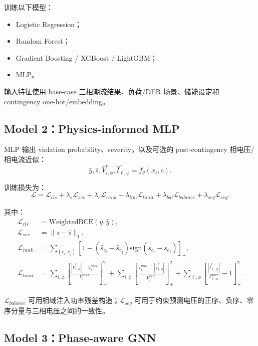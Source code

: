 \documentclass[UTF8,11pt]{ctexart}
\begin{document}
训练以下模型：

\begin{itemize}
    \item Logistic Regression；
    \item Random Forest；
    \item Gradient Boosting / XGBoost / LightGBM；
    \item MLP。
\end{itemize}

输入特征使用 base-case 三相潮流结果、负荷/DER 场景、储能设定和 contingency one-hot/embedding。

\subsection{Model 2：Physics-informed MLP}

MLP 输出 violation probability、severity，以及可选的 post-contingency 相电压/相电流近似：
\begin{equation}
    \hat{y}, \hat{s}, \widehat{V}_{i,\phi}^{c}, \widehat{I}_{\ell,\phi}^{c}=f_{\theta}(x_t,c).
\end{equation}

训练损失为：
\begin{equation}
    \mathcal{L}=\mathcal{L}_{cls}+\lambda_s\mathcal{L}_{sev}+\lambda_r\mathcal{L}_{rank}+\lambda_{lim}\mathcal{L}_{limit}+\lambda_{bal}\mathcal{L}_{balance}+\lambda_{seq}\mathcal{L}_{seq}.
\end{equation}

其中：
\begin{align}
    \mathcal{L}_{cls} &= \mathrm{WeightedBCE}(y,\hat{y}),\\
    \mathcal{L}_{sev} &= \|s-\hat{s}\|_1,\\
    \mathcal{L}_{rank} &= \sum_{(c_i,c_j)} \left[1-(\hat{s}_{c_i}-\hat{s}_{c_j})\mathrm{sign}(s_{c_i}-s_{c_j})\right]_+,\\
    \mathcal{L}_{limit} &= \sum_{i,\phi}\left[\frac{|\widehat{V}_{i,\phi}^{c}|-V_i^{max}}{V_i^{max}}\right]^2_+ + \sum_{i,\phi}\left[\frac{V_i^{min}-|\widehat{V}_{i,\phi}^{c}|}{V_i^{min}}\right]^2_+ + \sum_{\ell,\phi}\left[\frac{|\widehat{I}_{\ell,\phi}^{c}|}{I_{\ell,\phi}^{max}}-1\right]^2_+.
\end{align}

$\mathcal{L}_{balance}$ 可用相域注入功率残差构造；$\mathcal{L}_{seq}$ 可用于约束预测电压的正序、负序、零序分量与三相电压之间的一致性。

\subsection{Model 3：Phase-aware GNN}
\end{document}
